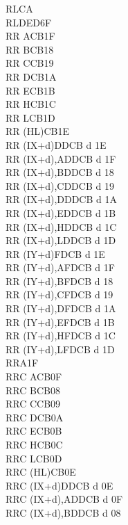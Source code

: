 \begin{multicols}{3}
{\begin{tabbing}
        RLCA\\
        RLD\>ED6F\\
        RR A\>CB1F\\
        RR B\>CB18\\
        RR C\>CB19\\
        RR D\>CB1A\\
        RR E\>CB1B\\
        RR H\>CB1C\\
        RR L\>CB1D\\
        RR (HL)\>CB1E\\
        RR (IX+d)\>DDCB d 1E\\
        RR (IX+d),A\UNDOC\>DDCB d 1F\\
        RR (IX+d),B\UNDOC\>DDCB d 18\\
        RR (IX+d),C\UNDOC\>DDCB d 19\\
        RR (IX+d),D\UNDOC\>DDCB d 1A\\
        RR (IX+d),E\UNDOC\>DDCB d 1B\\
        RR (IX+d),H\UNDOC\>DDCB d 1C\\
        RR (IX+d),L\UNDOC\>DDCB d 1D\\
        RR (IY+d)\>FDCB d 1E\\
        RR (IY+d),A\UNDOC\>FDCB d 1F\\
        RR (IY+d),B\UNDOC\>FDCB d 18\\
        RR (IY+d),C\UNDOC\>FDCB d 19\\
        RR (IY+d),D\UNDOC\>FDCB d 1A\\
        RR (IY+d),E\UNDOC\>FDCB d 1B\\
        RR (IY+d),H\UNDOC\>FDCB d 1C\\
        RR (IY+d),L\UNDOC\>FDCB d 1D\\
        RRA\>1F\\
        RRC A\>CB0F\\
        RRC B\>CB08\\
        RRC C\>CB09\\
        RRC D\>CB0A\\
        RRC E\>CB0B\\
        RRC H\>CB0C\\
        RRC L\>CB0D\\
        RRC (HL)\>CB0E\\
        RRC (IX+d)\>DDCB d 0E\\
        RRC (IX+d),A\UNDOC\>DDCB d 0F\\
        RRC (IX+d),B\UNDOC\>DDCB d 08\\

\end{tabbing}}
\end{multicols}
